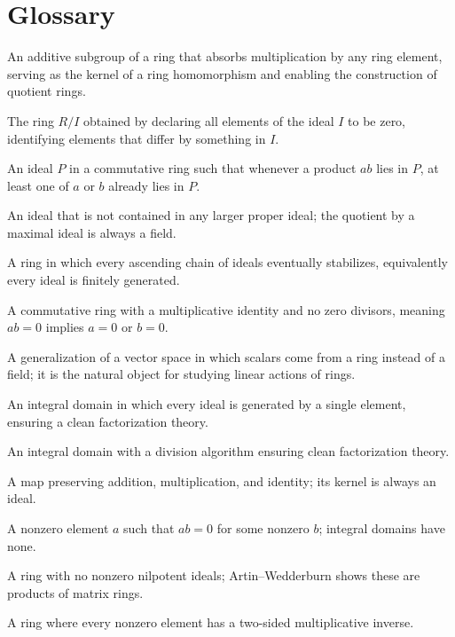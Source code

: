\section*{Glossary}
\begin{description}[leftmargin=*,style=nextline,itemsep=0.3em]
\item[\textbf{Ideal.}] An additive subgroup of a ring that absorbs multiplication by any ring element, serving as the kernel of a ring homomorphism and enabling the construction of quotient rings.
\item[\textbf{Quotient ring.}] The ring $R/I$ obtained by declaring all elements of the ideal $I$ to be zero, identifying elements that differ by something in $I$.
\item[\textbf{Prime ideal.}] An ideal $P$ in a commutative ring such that whenever a product $ab$ lies in $P$, at least one of $a$ or $b$ already lies in $P$.
\item[\textbf{Maximal ideal.}] An ideal that is not contained in any larger proper ideal; the quotient by a maximal ideal is always a field.
\item[\textbf{Noetherian ring.}] A ring in which every ascending chain of ideals eventually stabilizes, equivalently every ideal is finitely generated.
\item[\textbf{Integral domain.}] A commutative ring with a multiplicative identity and no zero divisors, meaning $ab=0$ implies $a=0$ or $b=0$.
\item[\textbf{Module.}] A generalization of a vector space in which scalars come from a ring instead of a field; it is the natural object for studying linear actions of rings.
\item[\textbf{Principal ideal domain.}] An integral domain in which every ideal is generated by a single element, ensuring a clean factorization theory.
\item[\textbf{Euclidean domain.}] An integral domain with a division algorithm ensuring clean factorization theory.
\item[\textbf{Ring homomorphism.}] A map preserving addition, multiplication, and identity; its kernel is always an ideal.
\item[\textbf{Zero divisor.}] A nonzero element $a$ such that $ab=0$ for some nonzero $b$; integral domains have none.
\item[\textbf{Semisimple ring.}] A ring with no nonzero nilpotent ideals; Artin--Wedderburn shows these are products of matrix rings.
\item[\textbf{Division ring.}] A ring where every nonzero element has a two-sided multiplicative inverse.
\end{description}

